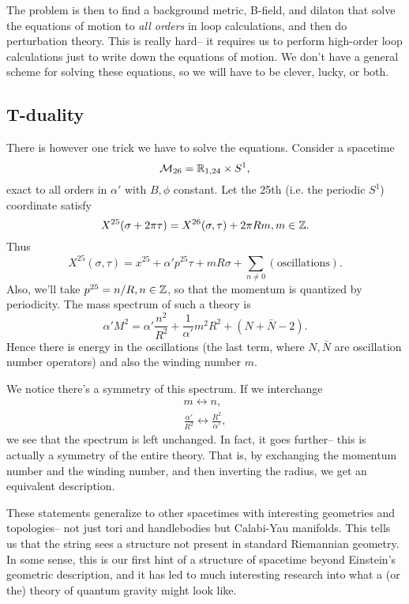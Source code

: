 The problem is then to find a background metric, B-field, and dilaton that solve the equations of motion to \emph{all orders} in loop calculations, and then do perturbation theory. This is really hard-- it requires us to perform high-order loop calculations just to write down the equations of motion. We don't have a general scheme for solving these equations, so we will have to be clever, lucky, or both.

\subsection*{T-duality}
There is however one trick we have to solve the equations. Consider a spacetime
\begin{equation}
    \mathcal{M}_{26}=\mathbb{R}_{1,24} \times S^1,
\end{equation}
exact to all orders in $\alpha'$ with $B,\phi$ constant. Let the 25th (i.e. the periodic $S^1$) coordinate satisfy
\begin{equation}
    X^{25}(\sigma+2\pi \tau)= X^{26}(\sigma,\tau)+2\pi Rm, m \in \mathbb{Z}.
\end{equation}
Thus
\begin{equation}
    X^{25}(\sigma,\tau)=x^{25}+\alpha' p^{25} \tau + mR \sigma +\sum_{n\neq 0}(\text{oscillations}).
\end{equation}
Also, we'll take $p^{25}=n/R, n\in \mathbb{Z}$, so that the momentum is quantized by periodicity. The mass spectrum of such a theory is
\begin{equation}
    \alpha' M^2 = \alpha'\frac{n^2}{R^2} +\frac{1}{\alpha'} m^2 R^2 +(N+\bar N-2).
\end{equation}
Hence there is energy in the oscillations (the last term, where $N,\bar N$ are oscillation number operators) and also the winding number $m$.

We notice there's a symmetry of this spectrum. If we interchange
\begin{gather*}
    m\leftrightarrow n,\\
    \frac{\alpha'}{R^2} \leftrightarrow \frac{R^2}{\alpha'},
\end{gather*}
we see that the spectrum is left unchanged. In fact, it goes further-- this is actually a symmetry of the entire theory. That is, by exchanging the momentum number and the winding number, and then inverting the radius, we get an equivalent description.

These statements generalize to other spacetimes with interesting geometries and topologies-- not just tori and handlebodies but Calabi-Yau manifolds. This tells us that the string sees a structure not present in standard Riemannian geometry. In some sense, this is our first hint of a structure of spacetime beyond Einstein's geometric description, and it has led to much interesting research into what a (or the) theory of quantum gravity might look like.